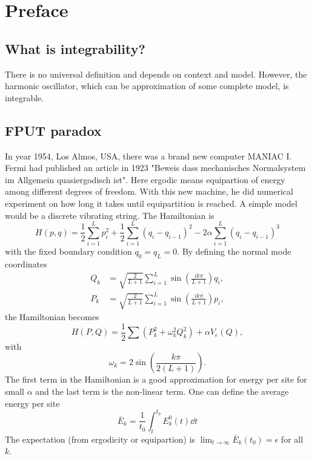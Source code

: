 \setcounter{chapter}{-1}
\chapter{Preface}
\section{What is integrability?}
There is no universal definition and depends on context and model. However, the harmonic oscillator, which can be approximation of some complete model, is integrable.

\section{FPUT paradox}
In year 1954, Los Almos, USA, there was a brand new computer MANIAC I. Fermi had published an article in 1923 "Beweis dass mechanisches Normalsystem im Allgemein quasiergodisch ist". Here ergodic means equipartion of energy among different degrees of freedom. With this new machine, he did numerical experiment on how long it takes until equipartition is reached. A simple model would be a discrete vibrating string. The Hamiltonian is 
\begin{equation*}
	H(p, q) =\frac{1}{2} \sum_{i=1}^{L}  p_i^2 + \frac{1}{2} \sum_{i=1}^{L} (q_i - q_{i-1})^2 - 2\alpha \sum_{i=1}^{L} (q_i - q_{i-1})^3
\end{equation*}
with the fixed boundary condition $q_0 = q_L = 0$. By defining the normal mode coordinates
\begin{align*}
	Q_k &= \sqrt{\frac{2}{L+1}} \sum_{i=1}^{L} \sin(\frac{ik\pi}{L+1}) q_i, \\
	P_k &= \sqrt{\frac{2}{L+1}} \sum_{i=1}^{L} \sin(\frac{ik \pi}{L+1}) p_i,
\end{align*}
the Hamiltonian becomes
\begin{equation}
	H(P, Q) = \frac{1}{2} \sum \left( P_k^2 + \omega_k^2 Q_k^2 \right)  + \alpha V_e(Q),
\end{equation}
with 
\begin{equation*}
\omega_k = 2 \sin(\frac{k\pi}{2(L+1)})	.
\end{equation*}
The first term in the Hamiltonian is a good approximation for energy per site for small $\alpha$ and the last term is the non-linear term. One can define the average energy per site
\begin{equation}
	\bar{E}_k = \frac{1}{t_0} \int_t^{t_0} E_k^0 (t) \dd{t}
\end{equation}
The expectation (from ergodicity or equipartion) is $\lim_{t\rightarrow \infty} \bar{E}_k(t_0) = \epsilon$ for all $k$.

